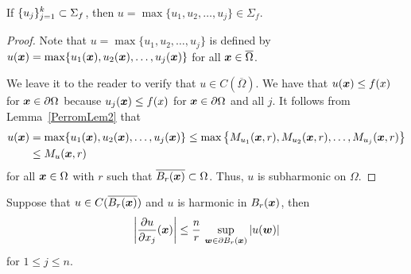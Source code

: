 \begin{lemma} \label{PerronLem5}
If $\displaystyle \{u_j\}_{j=1}^k \subset \Sigma_f$, then
$u = \max \{u_1, u_2, \ldots, u_j\} \in \Sigma_f$.
\end{lemma}

\begin{proof}
Note that $u = \max \{u_1, u_2, \ldots, u_j\}$ is defined by
$u({\bm{x}}) = \max \{u_1({\bm{x}}), u_2({\bm{x}}), \ldots, u_j({\bm{x}})\}$
for all ${\bm{x}} \in \overline{\Omega}$.

We leave it to the reader to verify that
$u \in C(\overline{\Omega})$.  We have that
$u({\bm{x}}) \leq f(x)$ for ${\bm{x}} \in \partial \Omega$ because
$u_j({\bm{x}}) \leq f(x)$ for ${\bm{x}} \in \partial \Omega$ and all $j$.
It follows from Lemma~\ref{PerromLem2} that
\begin{align*}
u({\bm{x}}) &= \max \{u_1({\bm{x}}), u_2({\bm{x}}), \ldots, u_j({\bm{x}})\}
\leq \max \left\{ M_{u_1}({\bm{x}},r), M_{u_2}({\bm{x}},r), \ldots,
M_{u_j}({\bm{x}},r) \right\} \\
&\leq  M_u({\bm{x}},r)
\end{align*}
for all ${\bm{x}} \in \Omega$ with $r$ such that
$\overline{B_r({\bm{x}})} \subset \Omega$.  Thus, $u$ is subharmonic on
$\Omega$.
\end{proof}

\begin{lemma} \label{PerronLem6}
Suppose that $\displaystyle u \in C(\overline{B_r({\bm{x}})})$
and $u$ is harmonic in $B_r({\bm{x}})$, then
\[
\left|\frac{\partial{u}}{\partial x_j}({\bm{x}})\right|
\leq \frac{n}{r}\, \sup_{{\bm{w}} \in \partial B_r({\bm{x}})} |u({\bm{w}})|
\]
for $1 \leq j \leq n$.
\end{lemma}

